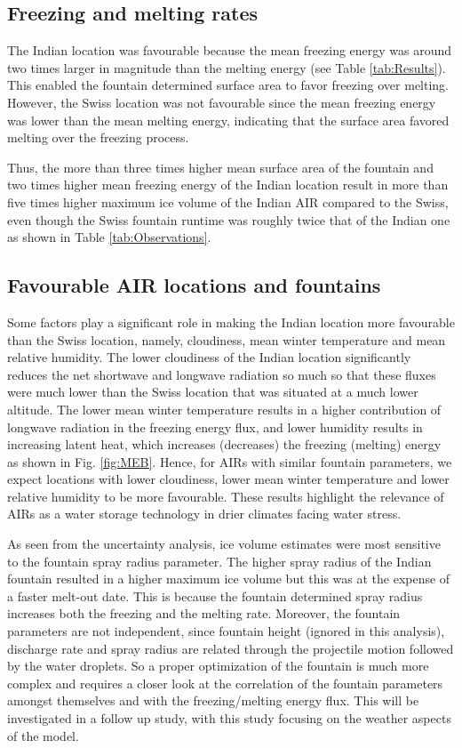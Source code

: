 \documentclass[utf8]{frontiersSCNS} %
\begin{document}
\subsection{Freezing and melting rates}

The Indian location was favourable because the mean freezing energy was around two times larger in magnitude
than the melting energy (see Table \ref{tab:Results}). This enabled the fountain determined surface area to
favor freezing over melting. However, the Swiss location was not favourable since the mean freezing energy was
lower than the mean melting energy, indicating that the surface area favored melting over the freezing process.

Thus, the more than three times higher mean surface area of the fountain and two times higher mean freezing
energy of the Indian location result in more than five times higher maximum ice volume of the Indian AIR
compared to the Swiss, even though the Swiss fountain runtime was roughly twice that of the Indian one as shown
in Table \ref{tab:Observations}.

\subsection{Favourable AIR locations and fountains}

Some factors play a significant role in making the Indian location more favourable than the Swiss location,
namely, cloudiness, mean winter temperature and mean relative humidity. The lower cloudiness of the Indian
location significantly reduces the net shortwave and longwave radiation so much so that these fluxes were much
lower than the Swiss location that was situated at a much lower altitude. The lower mean winter temperature
results in a higher contribution of longwave radiation in the freezing energy flux, and lower humidity results
in increasing latent heat, which increases (decreases) the freezing (melting) energy as shown in Fig.
\ref{fig:MEB}.  Hence, for AIRs with similar fountain parameters, we expect locations with lower cloudiness,
lower mean winter temperature and lower relative humidity to be more favourable. These results highlight the
relevance of AIRs as a water storage technology in drier climates facing water stress.

As seen from the uncertainty analysis, ice volume estimates were most sensitive to the fountain spray radius
parameter. The higher spray radius of the Indian fountain resulted in a higher maximum ice volume but this was
at the expense of a faster melt-out date. This is because the fountain determined spray radius increases both
the freezing and the melting rate. Moreover, the fountain parameters are not independent, since fountain height
(ignored in this analysis), discharge rate and spray radius are related through the projectile motion followed
by the water droplets. So a proper optimization of the fountain is much more complex and requires a closer look
at the correlation of the fountain parameters amongst themselves and with the freezing/melting energy flux. This
will be investigated in a follow up study, with this study focusing on the weather aspects of the model.
\end{document}
